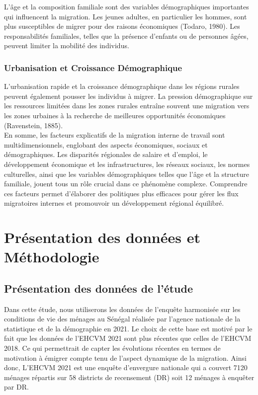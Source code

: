 \documentclass[a4paper,12pt]{article}
\begin{document}
L'âge et la composition familiale sont des variables démographiques importantes qui influencent la migration. Les jeunes adultes, en particulier les hommes, sont plus susceptibles de migrer pour des raisons économiques (Todaro, 1980). Les responsabilités familiales, telles que la présence d'enfants ou de personnes âgées, peuvent limiter la mobilité des individus.

\subsubsection{Urbanisation et Croissance Démographique}

L'urbanisation rapide et la croissance démographique dans les régions rurales peuvent également pousser les individus à migrer. La pression démographique sur les ressources limitées dans les zones rurales entraîne souvent une migration vers les zones urbaines à la recherche de meilleures opportunités économiques (Ravenstein, 1885).\\


En somme, les facteurs explicatifs de la migration interne de travail sont multidimensionnels, englobant des aspects économiques, sociaux et démographiques. Les disparités régionales de salaire et d'emploi, le développement économique et les infrastructures, les réseaux sociaux, les normes culturelles, ainsi que les variables démographiques telles que l'âge et la structure familiale, jouent tous un rôle crucial dans ce phénomène complexe. Comprendre ces facteurs permet d'élaborer des politiques plus efficaces pour gérer les flux migratoires internes et promouvoir un développement régional équilibré.




\section{Présentation des données et Méthodologie}

\subsection{Présentation des données de l’étude}

Dans cette étude, nous utiliserons les données de l’enquête harmonisée sur les conditions de vie des ménages au Sénégal réalisée par l’agence nationale de la statistique et de la démographie en 2021. Le choix de cette base est motivé par le fait que les données de l’EHCVM 2021 sont plus récentes que celles de l’EHCVM 2018. Ce qui permettrait de capter les évolutions récentes en termes de motivation à émigrer compte tenu de l’aspect dynamique de la migration.
Ainsi donc, L’EHCVM 2021 est une enquête d’envergure nationale qui a couvert 7120 ménages répartis sur 58 districts de recensement (DR) soit 12 ménages à enquêter par DR.\\
\end{document}
